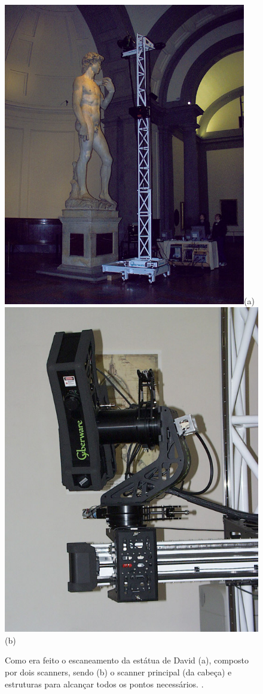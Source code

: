 \begin{figure}[!h]
	\centering
	\includegraphics[width=0.7\linewidth]{figs/gantry-and-david4-s.jpg}(a)
	\includegraphics[width=0.7\linewidth]{figs/mgantry-scannerhead-s.jpg}(b)
	\caption{%
	Como era feito o escaneamento da estátua de David (a), composto por dois scanners, sendo (b) o scanner principal (da cabeça) e estruturas para alcançar todos os pontos necessários.
	\cite{levoy2000digital}.
	}\label{fig:cabecaScanner}
\end{figure}

